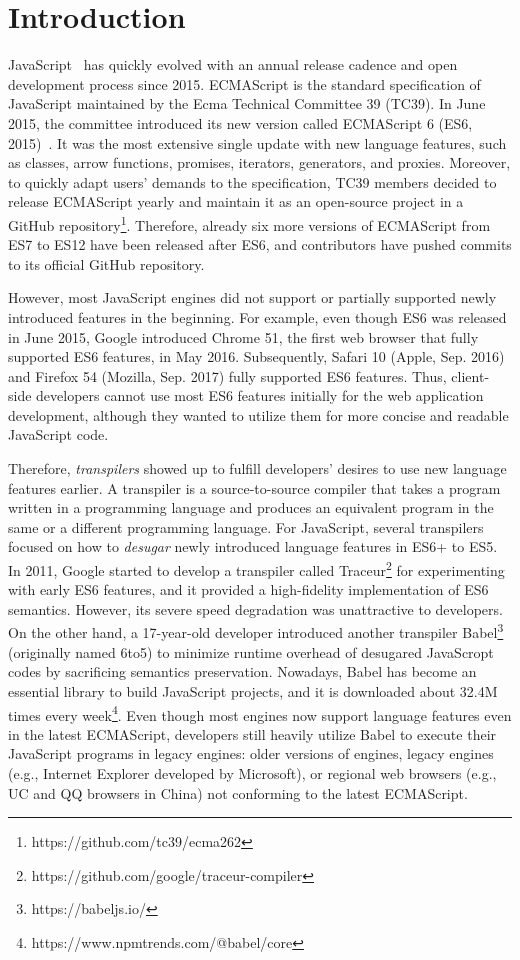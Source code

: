 \section{Introduction}\label{sec:intro}

JavaScript~\cite{js-hopl} has quickly evolved with an annual release cadence and
open development process since 2015. ECMAScript is the standard specification of
JavaScript maintained by the Ecma Technical Committee 39 (TC39). In June 2015,
the committee introduced its new version called ECMAScript 6 (ES6,
2015)~\cite{es6}. It was the most extensive single update with new language
features, such as classes, arrow functions, promises, iterators, generators, and
proxies. Moreover,  to quickly adapt users' demands to the specification, TC39
members decided to release ECMAScript yearly and maintain it as an open-source
project in a GitHub repository\footnote{https://github.com/tc39/ecma262}.
Therefore, already six more versions of ECMAScript from ES7 to ES12 have been
released after ES6, and contributors have pushed  commits to its
official GitHub repository.

However, most JavaScript engines did not support or partially supported newly
introduced features in the beginning. For example, even though ES6 was released
in June 2015, Google introduced Chrome 51, the first web browser that fully
supported ES6 features, in May 2016. Subsequently, Safari 10 (Apple, Sep. 2016)
and Firefox 54 (Mozilla, Sep. 2017) fully supported ES6 features. Thus,
client-side developers cannot use most ES6 features initially for the web
application development, although they wanted to utilize them for more concise
and readable JavaScript code.

Therefore, \textit{transpilers} showed up to fulfill developers' desires to use
new language features earlier. A transpiler is a source-to-source compiler that
takes a program written in a programming language and produces an equivalent
program in the same or a different programming language. For JavaScript, several
transpilers focused on how to \textit{desugar} newly introduced language
features in ES6+ to ES5. In 2011, Google started to develop a transpiler called
Traceur\footnote{https://github.com/google/traceur-compiler} for experimenting
with early ES6 features, and it provided a high-fidelity implementation of ES6
semantics. However, its severe speed degradation was unattractive to developers.
On the other hand, a 17-year-old developer introduced another transpiler
Babel\footnote{https://babeljs.io/} (originally named 6to5) to minimize runtime
overhead of desugared JavaScropt codes by sacrificing semantics preservation.
Nowadays, Babel has become an essential library to build JavaScript projects,
and it is downloaded about 32.4M times every
week\footnote{https://www.npmtrends.com/@babel/core}. Even though most engines
now support language features even in the latest ECMAScript, developers still
heavily utilize Babel to execute their JavaScript programs in legacy engines:
older versions of engines, legacy engines (e.g., Internet Explorer developed by
Microsoft), or regional web browsers (e.g., UC and QQ browsers in China) not
conforming to the latest ECMAScript.

\todo
